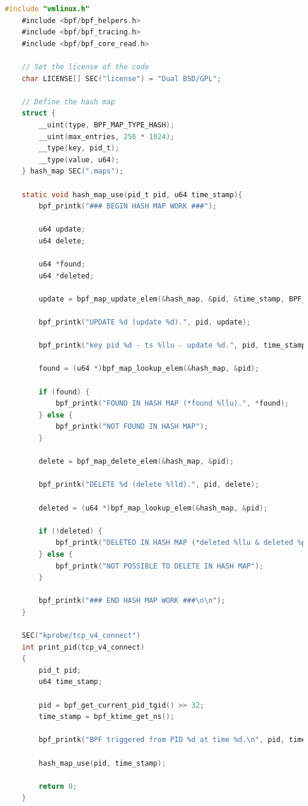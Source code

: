 \begin{lstlisting}[style=cstyle, language=C, caption={Code of the kernel side program that uses maps in libbpf-bootstrap.}]
	#include "vmlinux.h"
	#include <bpf/bpf_helpers.h>
	#include <bpf/bpf_tracing.h>
	#include <bpf/bpf_core_read.h>
	
	// Set the license of the code
	char LICENSE[] SEC("license") = "Dual BSD/GPL";
	
	// Define the hash map
	struct {
		__uint(type, BPF_MAP_TYPE_HASH);
		__uint(max_entries, 256 * 1024);
		__type(key, pid_t);
		__type(value, u64);
	} hash_map SEC(".maps");
	
	static void hash_map_use(pid_t pid, u64 time_stamp){
		bpf_printk("### BEGIN HASH MAP WORK ###");
		
		u64 update;
		u64 delete;
		
		u64 *found;
		u64 *deleted;
		
		update = bpf_map_update_elem(&hash_map, &pid, &time_stamp, BPF_ANY);
		
		bpf_printk("UPDATE %d (update %d).", pid, update);
		
		bpf_printk("key pid %d - ts %llu - update %d.", pid, time_stamp, update);
		
		found = (u64 *)bpf_map_lookup_elem(&hash_map, &pid);
		
		if (found) {
			bpf_printk("FOUND IN HASH MAP (*found %llu).", *found);
		} else {
			bpf_printk("NOT FOUND IN HASH MAP");
		}
		
		delete = bpf_map_delete_elem(&hash_map, &pid);
		
		bpf_printk("DELETE %d (delete %lld).", pid, delete);
		
		deleted = (u64 *)bpf_map_lookup_elem(&hash_map, &pid);
		
		if (!deleted) {
			bpf_printk("DELETED IN HASH MAP (*deleted %llu & deleted %p).", *deleted, deleted);
		} else {
			bpf_printk("NOT POSSIBLE TO DELETE IN HASH MAP");
		}
		
		bpf_printk("### END HASH MAP WORK ###\n\n");
	}
	
	SEC("kprobe/tcp_v4_connect")
	int print_pid(tcp_v4_connect)   
	{
		pid_t pid;
		u64 time_stamp;
		
		pid = bpf_get_current_pid_tgid() >> 32;
		time_stamp = bpf_ktime_get_ns();    
		
		bpf_printk("BPF triggered from PID %d at time %d.\n", pid, time_stamp);
		
		hash_map_use(pid, time_stamp);
		
		return 0;
	}
\end{lstlisting}

